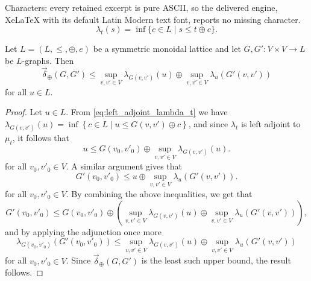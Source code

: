 \documentclass[10pt,a4paper]{amsart}
\newcommand{\atensor}{\oplus}
\begin{document}
Characters: every retained excerpt is pure ASCII, so the delivered engine, XeLaTeX with its default Latin Modern text font, reports no missing character.
\begin{equation}\label{eq:left_adjoint_lambda_t}
    \lambda_t(s)=\inf\{c\in L\mid s\leq t\atensor c\}.
\end{equation}

\begin{lemma}\label{lem:adjoint_sup_triangle_inequality}
Let $L=(L,\leq,\atensor,e)$ be a symmetric monoidal lattice and let $G,G'\colon V\times V\to L$ be $L$-graphs. Then
\begin{equation*}
    \vec{\delta}_\atensor(G,G')\leq\sup_{v,v'\in V}\lambda_{G(v,v')}\left(u\right)\atensor\sup_{v,v'\in V}\lambda_u\left(G'(v,v')\right)
\end{equation*}
for all $u\in L$.
\end{lemma}

\begin{proof}
Let $u\in L$. From \cref{eq:left_adjoint_lambda_t} we have $\lambda_{G(v,v')}(u)=\inf\left\{c\in L\mid u\leq G(v,v')\atensor c\right\}$, and since $\lambda_t$ is left adjoint to $\mu_t$, it follows that 
\begin{equation*}
u\leq G(v_0,v'_0)\atensor\sup_{v,v'\in V}\lambda_{G(v,v')}(u).
\end{equation*}
for all $v_0,v'_0\in V$. A similar argument gives that
\begin{equation*}
G'(v_0,v'_0)\leq u\atensor\sup_{v,v'\in V}\lambda_u\left(G'(v,v')\right).    
\end{equation*}
for all $v_0,v'_0\in V$. By combining the above inequalities, we get that
\begin{equation*}
G'(v_0,v'_0)\leq G(v_0,v'_0)\atensor\left(\sup_{v,v'\in V}\lambda_{G(v,v')}(u)\atensor\sup_{v,v'\in V}\lambda_u\left(G'(v,v')\right)\right), 
\end{equation*}
and by applying the adjunction once more
\begin{equation*}
\lambda_{G(v_0,v'_0)}\left(G'(v_0,v'_0)\right)\leq\sup_{v,v'\in V}\lambda_{G(v,v')}(u)\atensor\sup_{v,v'\in V}\lambda_u\left(G'(v,v')\right)
\end{equation*}
for all $v_0,v'_0\in V$. Since $\vec{\delta}_\atensor(G,G')$ is the least such upper bound, the result follows.
\end{proof}
\end{document}
